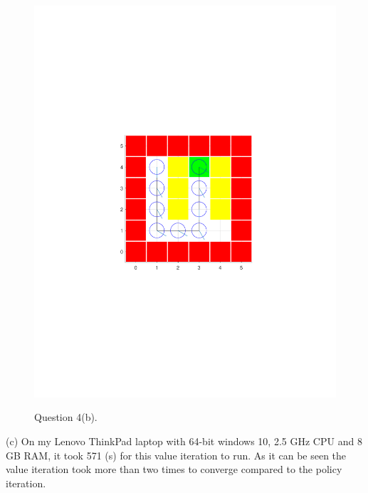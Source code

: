 \documentclass{article}
\begin{document}
\begin{figure}[h!]
\begin{minipage}{0.4\textwidth}
{				\includegraphics[trim={5cm 9cm 3cm 9cm},clip,scale = 0.7]{plots/ValueIteration/4b2.pdf}
				\label{fig:subfig2}} 
		\end{minipage}
		
		\caption{Question 4(b).}
		\label{fig:globfig}
	\end{figure}	
	
	\newpage
	(c) 	
	On my Lenovo ThinkPad laptop with 64-bit windows 10, 2.5 GHz CPU and 8 GB RAM, it took 571 (s) for this value iteration to run. As it can be seen the value iteration took more than two times to converge compared to the policy iteration. 

	\newpage
\end{document}
